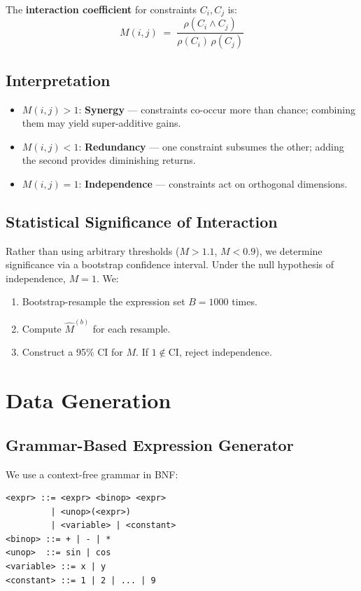 \documentclass[11pt,a4paper]{article}
\begin{document}
The \textbf{interaction coefficient} for constraints $C_i, C_j$ is:
\begin{equation}
  \boxed{M(i,j) \;=\; \frac{\rho(C_i \wedge C_j)}{\rho(C_i)\,\rho(C_j)}}
  \label{eq:metric}
\end{equation}

\subsection{Interpretation}
\begin{itemize}
  \item $M(i,j) > 1$: \textcolor{synergy}{\textbf{Synergy}} --- constraints co-occur more than chance; combining them may yield super-additive gains.
  \item $M(i,j) < 1$: \textcolor{redundancy}{\textbf{Redundancy}} --- one constraint subsumes the other; adding the second provides diminishing returns.
  \item $M(i,j) = 1$: \textbf{Independence} --- constraints act on orthogonal dimensions.
\end{itemize}

\subsection{Statistical Significance of Interaction}
Rather than using arbitrary thresholds ($M > 1.1$, $M < 0.9$), we determine significance via a bootstrap confidence interval. Under the null hypothesis of independence, $M = 1$. We:
\begin{enumerate}
  \item Bootstrap-resample the expression set $B = 1000$ times.
  \item Compute $\hat{M}^{(b)}$ for each resample.
  \item Construct a 95\% CI for $M$. If $1 \notin \text{CI}$, reject independence.
\end{enumerate}

\section{Data Generation}
\label{sec:datagen}

\subsection{Grammar-Based Expression Generator}
We use a context-free grammar in BNF:
\begin{lstlisting}[language={},frame=none,backgroundcolor=\color{white}]
<expr> ::= <expr> <binop> <expr>
         | <unop>(<expr>)
         | <variable> | <constant>
<binop> ::= + | - | *
<unop>  ::= sin | cos
<variable> ::= x | y
<constant> ::= 1 | 2 | ... | 9
\end{lstlisting}
\end{document}
